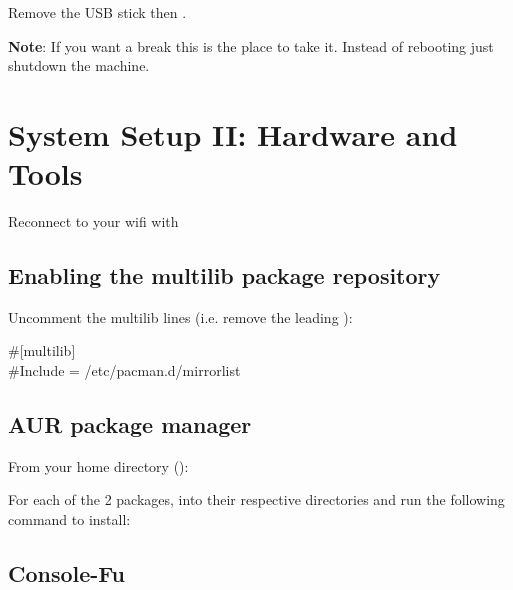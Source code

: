 
Remove the USB stick then .

\textbf{Note}: If you want a break this is the place to take it. Instead of rebooting just shutdown the machine.

\section{System Setup II: Hardware and Tools}

Reconnect to your wifi with 

\subsection{Enabling the multilib package repository}

\begin{blocksection}
	Uncomment the multilib lines (i.e. remove the leading \code{\#}):
	\begin{codeblock}
		\#[multilib]\\
		\#Include = /etc/pacman.d/mirrorlist
	\end{codeblock}
\end{blocksection}

\subsection{AUR package manager}

From your home directory ():


For each of the 2 packages,  into their respective directories and run the following command to install:


\subsection{Console-Fu}

